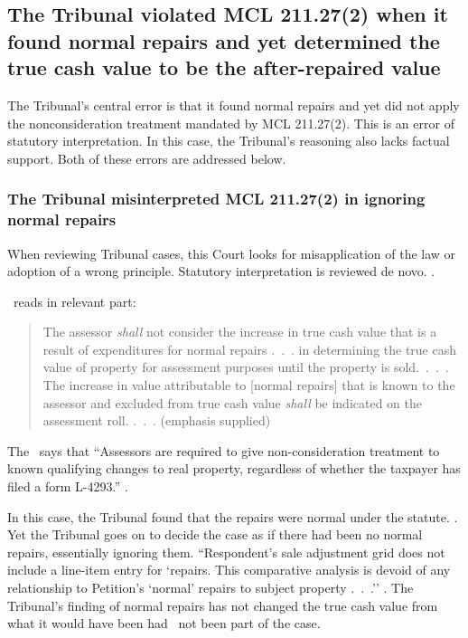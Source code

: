\documentclass[12pt,\documentclassflag]{michiganCourtOfAppealsBrief}
\begin{document}
\subsection{The Tribunal violated MCL 211.27(2) when it found normal repairs and yet determined the true cash value to be the after-repaired value}

The Tribunal's central error is that it found normal repairs and yet did not apply the nonconsideration treatment mandated by MCL 211.27(2). This is an error of statutory interpretation. In this case, the Tribunal's reasoning also lacks factual support. Both of these errors are addressed below.

\subsubsection{The Tribunal misinterpreted MCL 211.27(2) in ignoring normal repairs}

When reviewing Tribunal cases, this Court looks for misapplication of the law or adoption of a wrong principle. Statutory interpretation is reviewed de novo. . 

\mathieuGast\ reads in relevant part:

\begin{quote}
The assessor {\em shall} not consider the increase in true cash value that is a result of expenditures for normal repairs .~.~. in determining the true cash value of property for assessment purposes until the property is sold.~.~.~. The increase in value attributable to [normal repairs] that is known to the assessor and excluded from true cash value {\em shall} be indicated on the assessment roll. .~.~. (emphasis supplied)
\end{quote}

The \STC\ says that ``Assessors are required to give non-consideration treatment to known qualifying changes to real property, regardless of whether the taxpayer has filed a form L-4293.'' .

In this case, the Tribunal found that the repairs were normal under the statute. \foj[4]. Yet the Tribunal goes on to decide the case as if there had been no normal repairs, essentially ignoring them. ``Respondent's sale adjustment grid does not include a line-item entry for `repairs. This comparative analysis is devoid of any relationship to Petition's `normal' repairs to subject property .~.~.'' \foj[6]. The Tribunal's finding of normal repairs has not changed the true cash value from what it would have been had \mathieuGast\ not been part of the case.
\end{document}
